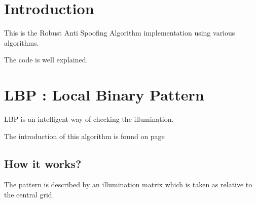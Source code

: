 \documentclass{article}
\begin{document}
\thispagestyle{empty}
\cleardoublepage %
\listoffigures
{} 
\cleardoublepage


\setcounter{page}{1}


\section{Introduction}\label{sec:intro}
This is the Robust Anti Spoofing Algorithm implementation using various algorithms.

The code is well explained.
\lipsum[1]

\newpage %
\section{LBP : Local Binary Pattern}
LBP is an intelligent way of checking the illumination. \cite{ref:Spoof_two,ref:three,ref:Spoof}

The introduction of this algorithm is found on page \pageref{sec:intro}






\subsection{How it works?}
The pattern is described by an illumination matrix which is  taken as relative to the central grid.
	
\end{document}
